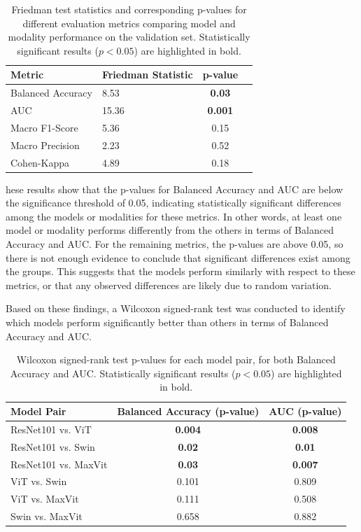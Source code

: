 \documentclass[a4paper,10pt]{book}
\begin{document}
\begin{table}[h!]
  \centering
\caption[Summary of Friedman test statistics and p-values for all evaluation metrics.]{Friedman test statistics and corresponding p-values for different evaluation metrics comparing model and modality performance on the validation set. Statistically significant results ($p < 0.05$) are highlighted in bold.}
  \label{tab:friedman_test_results}
  \begin{tabular}{l l c c}
    \toprule
    \textbf{Metric} & \textbf{Friedman Statistic} & \textbf{p-value} \\
    \midrule
    Balanced Accuracy & 8.53 & \textbf{0.03}  \\
    AUC  & 15.36  &  \textbf{0.001 }\\
    Macro F1-Score    &  5.36  & 0.15 \\
    Macro Precision & 2.23 &  0.52 \\
    Cohen-Kappa & 4.89 & 0.18 \\
    \bottomrule
  \end{tabular}
\end{table}


hese results show that the p-values for Balanced Accuracy and AUC are below the significance threshold of 0.05, indicating statistically significant differences among the models or modalities for these metrics. In other words, at least one model or modality performs differently from the others in terms of Balanced Accuracy and AUC. For the remaining metrics, the p-values are above 0.05, so there is not enough evidence to conclude that significant differences exist among the groups. This suggests that the models perform similarly with respect to these metrics, or that any observed differences are likely due to random variation.

Based on these findings, a Wilcoxon signed-rank test was conducted to identify which models perform significantly better than others in terms of Balanced Accuracy and AUC.

\begin{table}[h!]
  \centering
  \caption[Wilcoxon signed-rank test p-values for each model pair.]{Wilcoxon signed-rank test p-values for each model pair, for both Balanced Accuracy and AUC. Statistically significant results ($p < 0.05$) are highlighted in bold.}
  \label{tab:wilcoxon_pvalues}
  \begin{tabular}{@{}lcc@{}}
    \toprule
    \textbf{Model Pair} & \textbf{Balanced Accuracy (p-value)} & \textbf{AUC (p-value)} \\
    \midrule
    ResNet101 vs. ViT      & \textbf{0.004} & \textbf{0.008} \\
    ResNet101 vs. Swin     & \textbf{0.02} & \textbf{0.01} \\
    ResNet101 vs. MaxVit   & \textbf{0.03} & \textbf{0.007} \\
    ViT vs. Swin           & 0.101 & 0.809 \\
    ViT vs. MaxVit         & 0.111 & 0.508 \\
    Swin vs. MaxVit        & 0.658 & 0.882 \\
    \bottomrule
  \end{tabular}
\end{table}
\end{document}
